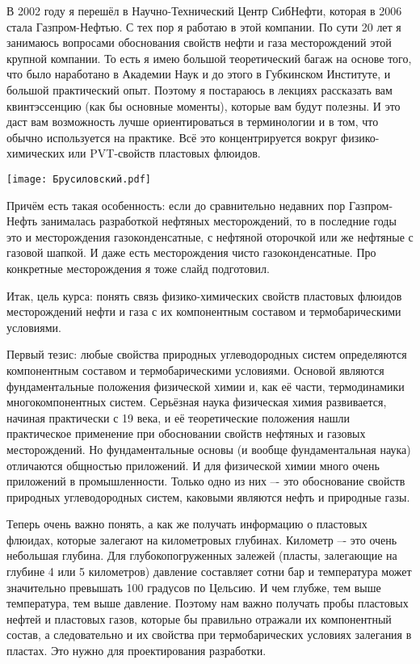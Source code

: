 \documentclass[main.tex]{subfiles}
\begin{document}
В 2002 году я перешёл в Научно-Технический Центр СибНефти, которая в 2006 стала Газпром-Нефтью.
С тех пор я работаю в этой компании.
По сути 20 лет я занимаюсь вопросами обоснования свойств нефти и газа месторождений этой крупной компании.
То есть я имею большой теоретический багаж на основе того, что было наработано в Академии Наук и до этого в Губкинском Институте, и большой практический опыт.
Поэтому я постараюсь в лекциях рассказать вам квинтэссенцию (как бы основные моменты), которые вам будут полезны.
И это даст вам возможность лучше ориентироваться в терминологии и в том, что обычно используется на практике.
Всё это концентрируется вокруг физико-химических или PVT-свойств пластовых флюидов.

\begin{center}
\texttt{[image: Брусиловский.pdf]}
\end{center}

Причём есть такая особенность: если до сравнительно недавних пор Газпром-Нефть занималась разработкой нефтяных месторождений, то в последние годы это и месторождения газоконденсатные, с нефтяной оторочкой или же нефтяные с газовой шапкой.
И даже есть месторождения чисто газоконденсатные.
Про конкретные месторождения я тоже слайд подготовил.

Итак, цель курса: понять связь физико-химических свойств пластовых флюидов месторождений нефти и газа с их компонентным составом и термобарическими условиями.

Первый тезис: любые свойства природных углеводородных систем определяются компонентным составом и термобарическими условиями.
Основой являются фундаментальные положения физической химии и, как её части, термодинамики многокомпонентных систем.
Серьёзная наука физическая химия развивается, начиная практически с 19 века, и её теоретические положения нашли практическое применение при обосновании свойств нефтяных и газовых месторождений.
Но фундаментальные основы (и вообще фундаментальная наука) отличаются общностью приложений.
И для физической химии много очень приложений в промышленности.
Только одно из них –- это обоснование свойств природных углеводородных систем, каковыми являются нефть и природные газы.

Теперь очень важно понять, а как же получать информацию о пластовых флюидах, которые залегают на километровых глубинах.
Километр –- это очень небольшая глубина.
Для глубокопогруженных залежей (пласты, залегающие на глубине 4 или 5 километров) давление составляет сотни бар и температура может значительно превышать 100 градусов по Цельсию.
И чем глубже, тем выше температура, тем выше давление.
Поэтому нам важно получать пробы пластовых нефтей и пластовых газов, которые бы правильно отражали их компонентный состав, а следовательно и их свойства при термобарических условиях залегания в пластах.
Это нужно для проектирования разработки.
\end{document}
